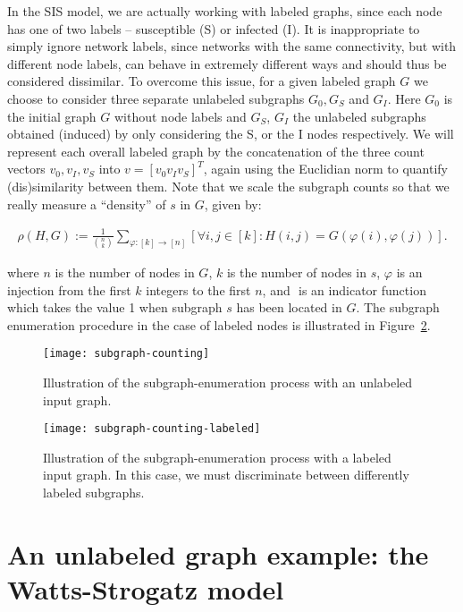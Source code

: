 In the SIS model, we are actually working with labeled graphs, since
each node has one of two labels – susceptible (S) or infected (I). It
is inappropriate to simply ignore network labels, since networks with
the same connectivity, but with different node labels, can behave in
extremely different ways and should thus be considered dissimilar. To
overcome this issue, for a given labeled graph $G$ we choose to
consider three separate unlabeled subgraphs $G_0, G_S$ and $G_I$. Here
$G_0$ is the initial graph $G$ without node labels and $G_S$, $G_I$
the unlabeled subgraphs obtained (induced) by only considering the S,
or the I nodes respectively. We will represent each overall labeled
graph by the concatenation of the three count vectors $v_0, v_I, v_S$
into $v = [v_0 v_I v_S]^T$, again using the Euclidian norm to quantify (dis)similarity
between them. Note that we scale the subgraph counts so that we really
measure a “density” of $s$ in $G$, given by:

\begin{align}
  \label{eqn:homdenG}
  \rho(H,G) := \frac{1}{{n\choose k}} \!  \sum_{\varphi:[k] \to [n]} \!
  \left[ \forall  i, j \in [k] \! : \! H(i,j) \! = \! G(\varphi(i),
  \varphi(j)) \right].
\end{align}

where $n$ is the number of nodes in $G$, $k$ is the number of nodes in
$s$, $\varphi$ is an injection from the first $k$ integers to the
first $n$, and $\!$ is an indicator function which takes the value 1
when subgraph $s$ has been located in $G$. The subgraph enumeration
procedure in the case of labeled nodes is illustrated in Figure~\ref{fig:sis5}.

\begin{figure}[!htp]
\centering
\texttt{[image: subgraph-counting]}
\caption{Illustration of the subgraph-enumeration process with an
  unlabeled input graph. \label{fig:sis4}}
\end{figure}

\begin{figure}[!htp]
\centering
\texttt{[image: subgraph-counting-labeled]}
\caption{Illustration of the subgraph-enumeration process with a
  labeled input graph. In this case, we must discriminate between
  differently labeled subgraphs. \label{fig:sis5}}
\end{figure}

\section{An unlabeled graph example: the Watts-Strogatz model}


